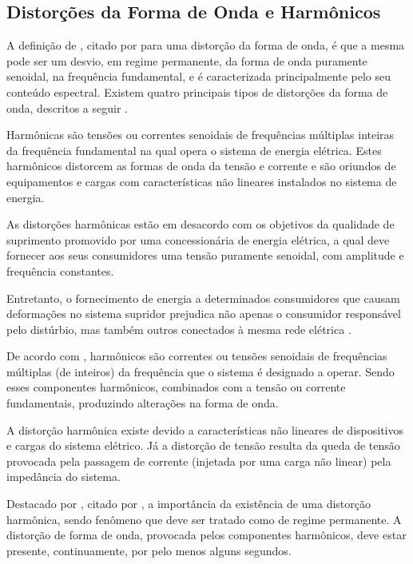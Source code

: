 \subsection{Distorções da Forma de Onda e Harmônicos}
\par 
A definição de \cite{OLIVE}, citado por \cite{DEL03} para uma distorção da forma de onda, é que a mesma pode ser um desvio, em regime permanente, da forma de onda puramente senoidal, na frequência fundamental, e é caracterizada principalmente pelo seu conteúdo espectral. Existem quatro principais tipos de distorções da forma de onda, descritos a seguir \cite{DUG96}.
\par
Harmônicas são tensões ou correntes senoidais de frequências múltiplas inteiras da frequência fundamental na qual opera o sistema de energia elétrica. Estes harmônicos distorcem as formas de onda da tensão e corrente e são oriundos de equipamentos e cargas com características não lineares instalados no sistema de energia. 
\par
As distorções harmônicas estão em desacordo com os objetivos da qualidade de suprimento promovido por uma concessionária de energia elétrica, a qual deve fornecer aos seus consumidores uma tensão puramente senoidal, com amplitude e frequência constantes. \par
\par
Entretanto, o fornecimento de energia a determinados consumidores que causam deformações no sistema supridor prejudica não apenas o consumidor responsável pelo distúrbio, mas também outros conectados à mesma rede elétrica \cite{DEL03}.
\par
De acordo com \cite{FER99}, harmônicos são correntes ou tensões senoidais de frequências múltiplas (de inteiros) da frequência que o sistema é designado a operar. Sendo esses componentes harmônicos, combinados com a tensão ou corrente fundamentais, produzindo alterações na forma de onda. 
\par
A distorção harmônica existe devido a características não lineares de dispositivos e cargas do sistema elétrico. Já a distorção de tensão resulta da queda de tensão provocada pela passagem de corrente (injetada por uma carga não linear) pela impedância do sistema.
\par
Destacado por \cite{DUG96}, citado por \cite{FER99}, a importância da existência de uma distorção harmônica, sendo fenômeno que deve ser tratado como de regime permanente. A distorção de forma de onda, provocada pelos componentes harmônicos, deve estar presente, continuamente, por pelo menos alguns segundos.

